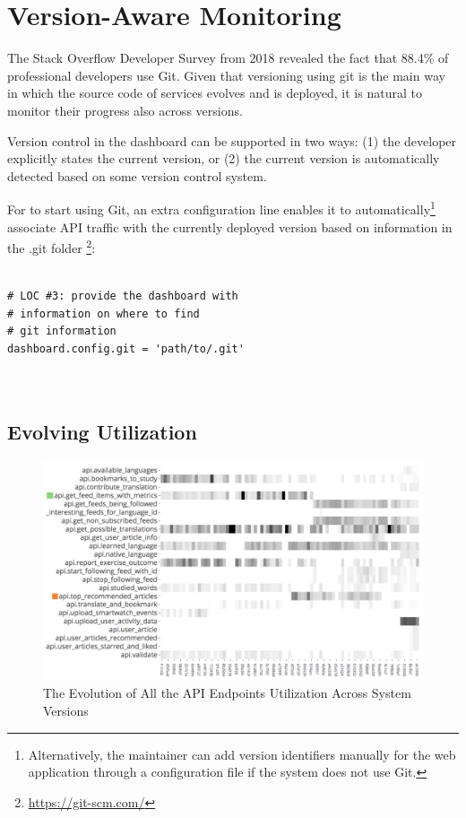   
  \section{Version-Aware Monitoring}
    \label{sec:evolution}
  
  The Stack Overflow Developer Survey from 2018 revealed the fact that 88.4\% of professional developers use Git. 
  Given that versioning using git is the main way in which the source code of services evolves and is deployed, it is natural to monitor their progress also across versions. 

  Version control in the dashboard can be supported in two ways: 
  (1) the developer explicitly states the current version, or 
  (2) the current version is automatically detected based on some version control system. 

  For \tool to start using Git, an extra configuration line enables it to automatically\footnote{Alternatively, the maintainer can add version identifiers manually for the web application through a configuration file if the system does not use Git.} associate API traffic with the currently deployed version based on information in the .git folder \footnote{\url{https://git-scm.com/}}: 
    
\begin{lstlisting}[style=custompython]

# LOC #3: provide the dashboard with 
# information on where to find 
# git information 
dashboard.config.git = 'path/to/.git'
  
      
\end{lstlisting}  
 

  

  \subsection*{Evolving Utilization}

    \begin{figure}[h!]
      \centering
      \includegraphics[width=0.9\linewidth]{utilization-evolution}
      \caption{The Evolution of All the API Endpoints Utilization Across System Versions}
      \label{fig:mv-util}
    \end{figure}

